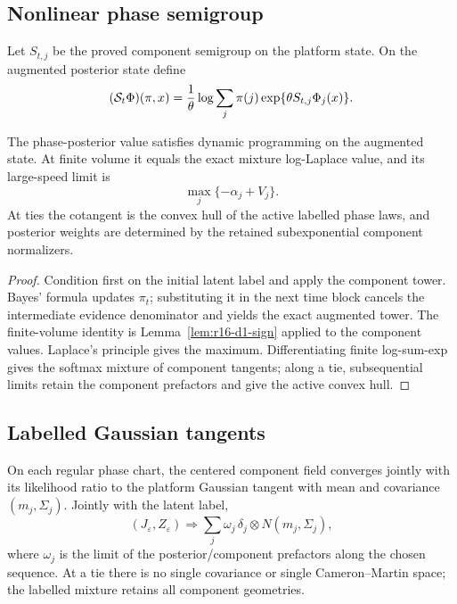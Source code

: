 \subsection{Nonlinear phase semigroup}

Let \(S_{t,j}\) be the proved component semigroup on the platform state.  On
the augmented posterior state define
\[
 (\mathcal S_t\Phi)(\pi,x)
 ={1\over\theta}
 \log\sum_j\pi(j)
 \exp\{\theta S_{t,j}\Phi_j(x)\}.
\]

\begin{theorem}
\label{thm:r16-d1-semigroup}
The phase-posterior value satisfies dynamic programming on the augmented state.
At finite volume it equals the exact mixture log-Laplace value, and its
large-speed limit is
\[
 \max_j\{-\alpha_j+V_j\}.
\]
At ties the cotangent is the convex hull of the active labelled phase laws,
and posterior weights are determined by the retained subexponential component
normalizers.
\end{theorem}

\begin{proof}
Condition first on the initial latent label and apply the component tower.
Bayes' formula updates \(\pi_t\); substituting it in the next time block
cancels the intermediate evidence denominator and yields the exact augmented
tower.  The finite-volume identity is Lemma~\ref{lem:r16-d1-sign} applied to
the component values.  Laplace's principle gives the maximum.  Differentiating
finite log-sum-exp gives the softmax mixture of component tangents; along a tie,
subsequential limits retain the component prefactors and give the active convex
hull.
\end{proof}

\subsection{Labelled Gaussian tangents}

\begin{theorem}
\label{thm:r16-d1-gaussian}
On each regular phase chart, the centered component field converges jointly
with its likelihood ratio to the platform Gaussian tangent with mean and
covariance \((m_j,\Sigma_j)\).  Jointly with the latent label,
\[
 (J_\varepsilon,Z_\varepsilon)
 \Longrightarrow\sum_j\omega_j\,
 \delta_j\otimes N(m_j,\Sigma_j),
\]
where \(\omega_j\) is the limit of the posterior/component prefactors along
the chosen sequence.  At a tie there is no single covariance or single
Cameron--Martin space; the labelled mixture retains all component geometries.
\end{theorem}

